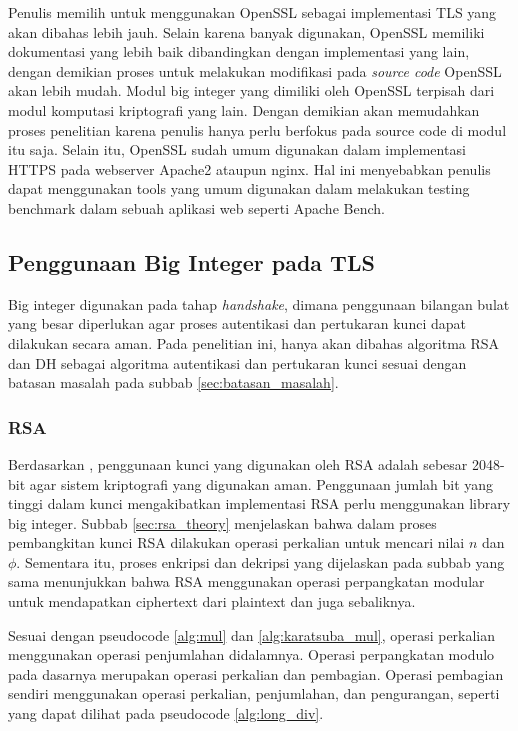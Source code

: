Penulis memilih untuk menggunakan OpenSSL sebagai implementasi TLS yang akan dibahas lebih jauh. Selain karena banyak digunakan, OpenSSL memiliki dokumentasi yang lebih baik dibandingkan dengan implementasi yang lain, dengan demikian proses untuk melakukan modifikasi pada \textit{source code} OpenSSL akan lebih mudah. Modul big integer yang dimiliki oleh OpenSSL terpisah dari modul komputasi kriptografi yang lain. Dengan demikian akan memudahkan proses penelitian karena penulis hanya perlu berfokus pada source code di modul itu saja. Selain itu, OpenSSL sudah umum digunakan dalam implementasi HTTPS pada webserver Apache2 ataupun nginx. Hal ini menyebabkan penulis dapat menggunakan tools yang umum digunakan dalam melakukan testing benchmark dalam sebuah aplikasi web seperti Apache Bench.

\subsection{Penggunaan Big Integer pada TLS}
Big integer digunakan pada tahap \textit{handshake}, dimana penggunaan bilangan bulat yang besar diperlukan agar proses autentikasi dan pertukaran kunci dapat dilakukan secara aman. Pada penelitian ini, hanya akan dibahas algoritma RSA dan DH sebagai algoritma autentikasi dan pertukaran kunci sesuai dengan batasan masalah pada subbab \ref{sec:batasan_masalah}.

\subsubsection{RSA} \label{sec:rsa_bn_usage}
Berdasarkan \citet{key_suggestion}, penggunaan kunci yang digunakan oleh RSA adalah sebesar 2048-bit agar sistem kriptografi yang digunakan aman. Penggunaan jumlah bit yang tinggi dalam kunci mengakibatkan implementasi RSA perlu menggunakan library big integer. Subbab \ref{sec:rsa_theory} menjelaskan bahwa dalam proses pembangkitan kunci RSA dilakukan operasi perkalian untuk mencari nilai $n$ dan $\phi$. Sementara itu, proses enkripsi dan dekripsi yang dijelaskan pada subbab yang sama menunjukkan bahwa RSA menggunakan operasi perpangkatan modular untuk mendapatkan ciphertext dari plaintext dan juga sebaliknya.

Sesuai dengan pseudocode \ref{alg:mul} dan \ref{alg:karatsuba_mul}, operasi perkalian menggunakan operasi penjumlahan didalamnya. Operasi perpangkatan modulo pada dasarnya merupakan operasi perkalian dan pembagian. Operasi pembagian sendiri menggunakan operasi perkalian, penjumlahan, dan pengurangan, seperti yang dapat dilihat pada pseudocode \ref{alg:long_div}.

